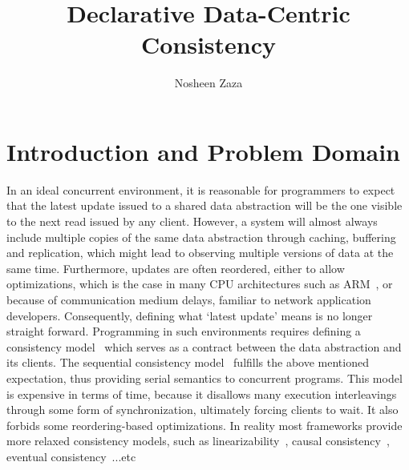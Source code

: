 \documentclass[]{usiinfprospectus}
\author{Nosheen Zaza}
\title{Declarative Data-Centric Consistency }
\begin{document}
\maketitle


\section{Introduction and Problem Domain}




In an ideal concurrent environment, it is reasonable for programmers to expect that the latest update issued to a shared data abstraction will be the one visible to the next read issued by any client. However, a system will almost always include multiple copies of the same data abstraction through caching, buffering and replication, which might lead to observing multiple versions of data at the same time. Furthermore, updates are often reordered, either to allow optimizations, which is the case in many CPU architectures such as ARM~\cite{Chong:2008:RAW:1353522.1353528}, or because of communication medium delays, familiar to network application developers. Consequently, defining what `latest update' means is no longer straight forward. Programming in such environments requires defining a consistency model~\cite{adve1996shared} which serves as a contract between the data abstraction and its clients. The sequential consistency model~\cite{lamport1979make} fulfills the above mentioned expectation, thus providing serial semantics to concurrent programs. This model is expensive in terms of time, because it disallows many execution interleavings through some form of synchronization, ultimately forcing clients to wait. It also forbids some reordering-based optimizations. In reality most frameworks provide more relaxed consistency models, such as linearizability~\cite{herlihy1990linearizability}, causal consistency~\cite{raynal1995causal}, eventual consistency~\cite{terry1995managing}...etc 
\end{document}
